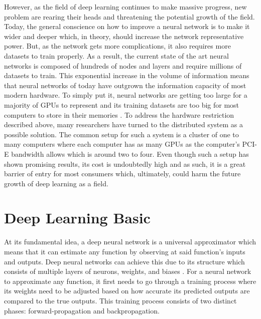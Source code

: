 \documentclass[conference]{IEEEtran}
\begin{document}
        However, as the field of deep learning continues to make massive progress, new problem are rearing their heads and threatening the potential growth of the field. Today, the general conscience on how to improve a neural network is to make it wider and deeper which, in theory, should increase the network representative power. But, as the network gets more complications, it also requires more datasets to train properly. As a result, the current state of the art neural networks is composed of hundreds of nodes and layers and require millions of datasets to train. This exponential increase in the volume of information means that neural networks of today have outgrown the information capacity of most modern hardware. To simply put it, neural networks are getting too large for a majority of GPUs to represent and its training datasets are too big for most computers to store in their memories \cite{ben-nun_hoefler_2019}. To address the hardware restriction described above, many researchers have turned to the distributed system as a possible solution. The common setup for such a system is a cluster of one to many computers where each computer has as many GPUs as the computer's PCI-E bandwidth allows which is around two to four.  Even though such a setup has shown promising results, its cost is undoubtedly high and as such, it is a great barrier of entry for most consumers which, ultimately, could harm the future growth of deep learning as a field.
        
    \section{Deep Learning Basic}
        At its fundamental idea, a deep neural network is a universal approximator which means that it can estimate any function by observing at said function's inputs and outputs. Deep neural networks can achieve this due to its structure which consists of multiple layers of neurons, weights, and biases \cite{hornik_1991}. For a neural network to approximate any function, it first needs to go through a training process where its weights need to be adjusted based on how accurate its predicted outputs are compared to the true outputs. This training process consists of two distinct phases: forward-propagation and backpropagation. 
\end{document}
